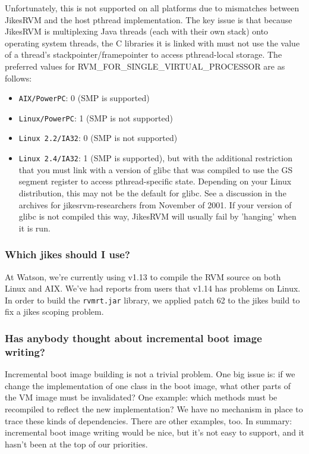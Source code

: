 Unfortunately, this is not supported on all platforms due to
mismatches between JikesRVM and the host pthread implementation.  
The key issue is that because JikesRVM is multiplexing Java threads
(each with their own stack) onto operating system threads, the
C libraries it is linked with must not use the value of a thread's
stackpointer/framepointer to access pthread-local storage.  The
preferred values for RVM\_FOR\_SINGLE\_VIRTUAL\_PROCESSOR are as
follows: 
\begin{itemize}
\item {\tt AIX/PowerPC}: 0 (SMP is supported)
\item {\tt Linux/PowerPC}:  1 (SMP is not supported)
\item {\tt Linux 2.2/IA32}: 0 (SMP is not supported)
\item {\tt Linux 2.4/IA32}: 1 (SMP is supported), but with the
additional restriction that you must link with a version of glibc that
was compiled to use the GS segment register to access pthread-specific
state.  Depending on your Linux distribution, this may not be the
default for glibc. See a discussion in the archives for
jikesrvm-researchers from November of 2001. If your version of glibc
is not compiled this way, JikesRVM will usually fail by 'hanging' when
it is run.
\end{itemize}                

\subsubsection{Which jikes should I use?}
At Watson, we're currently using 
 v1.13 to compile the RVM source on
both Linux and AIX\AIXTMFootnote.  We've had reports from users that
v1.14 has problems 
on Linux.  In order to build the {\tt rvmrt.jar} library, we applied 
patch 62
to the jikes build to fix a jikes scoping problem.


\subsubsection{Has anybody thought about incremental boot image writing?}

Incremental boot image building is not a trivial problem.  One big
issue is: if we change the implementation of one class in the boot image,
what other parts of the VM image must be invalidated?  One example: which
methods must be recompiled to reflect the new implementation?  We have no
mechanism in place to trace these kinds of dependencies.  There are other
examples, too.  In summary: incremental boot image writing would be nice,
but it's not easy to support, and it hasn't been at the top of our
priorities.

